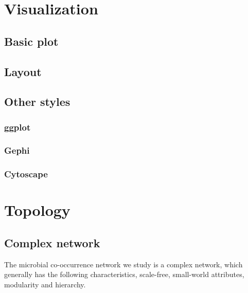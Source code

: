 \documentclass[
]{book}
\begin{document}
\hypertarget{visualization}{%
\chapter{Visualization}\label{visualization}}

\hypertarget{basic-plot}{%
\section{Basic plot}\label{basic-plot}}

\hypertarget{layout}{%
\section{Layout}\label{layout}}

\hypertarget{other-styles}{%
\section{Other styles}\label{other-styles}}

\hypertarget{ggplot}{%
\subsection{ggplot}\label{ggplot}}

\hypertarget{gephi}{%
\subsection{Gephi}\label{gephi}}

\hypertarget{cytoscape}{%
\subsection{Cytoscape}\label{cytoscape}}

\hypertarget{topology}{%
\chapter{Topology}\label{topology}}

\hypertarget{complex-network}{%
\section{Complex network}\label{complex-network}}

The microbial co-occurrence network we study is a complex network, which generally has the following characteristics, scale-free, small-world attributes, modularity and hierarchy.
\end{document}
